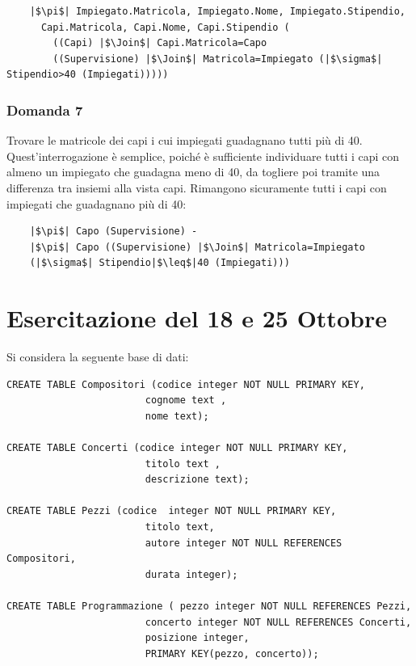 \documentclass{article}
\numberwithin{equation}{subsection}
\begin{document}
\begin{verbatim}
    |$\pi$| Impiegato.Matricola, Impiegato.Nome, Impiegato.Stipendio, 
      Capi.Matricola, Capi.Nome, Capi.Stipendio (
        ((Capi) |$\Join$| Capi.Matricola=Capo
        ((Supervisione) |$\Join$| Matricola=Impiegato (|$\sigma$| Stipendio>40 (Impiegati)))))
\end{verbatim}

\subsubsection*{Domanda 7}

Trovare le matricole dei capi i cui impiegati guadagnano tutti più di 40. Quest'interrogazione è semplice, poiché è sufficiente individuare tutti i capi con almeno un impiegato che guadagna meno di 40, da togliere poi 
tramite una differenza tra insiemi alla vista capi. Rimangono sicuramente tutti i capi con impiegati che guadagnano più di 40:
\begin{verbatim}
    |$\pi$| Capo (Supervisione) -
    |$\pi$| Capo ((Supervisione) |$\Join$| Matricola=Impiegato
    (|$\sigma$| Stipendio|$\leq$|40 (Impiegati)))

\end{verbatim}

\clearpage

\section{Esercitazione del 18 e 25 Ottobre}


Si considera la seguente base di dati:
\begin{verbatim}
CREATE TABLE Compositori (codice integer NOT NULL PRIMARY KEY,
                        cognome text ,
                        nome text);
						
CREATE TABLE Concerti (codice integer NOT NULL PRIMARY KEY,
                        titolo text ,
                        descrizione text);

CREATE TABLE Pezzi (codice  integer NOT NULL PRIMARY KEY,
                        titolo text,
                        autore integer NOT NULL REFERENCES Compositori,
                        durata integer);

CREATE TABLE Programmazione ( pezzo integer NOT NULL REFERENCES Pezzi,
                        concerto integer NOT NULL REFERENCES Concerti, 
                        posizione integer,
                        PRIMARY KEY(pezzo, concerto));

\end{verbatim}
\end{document}
